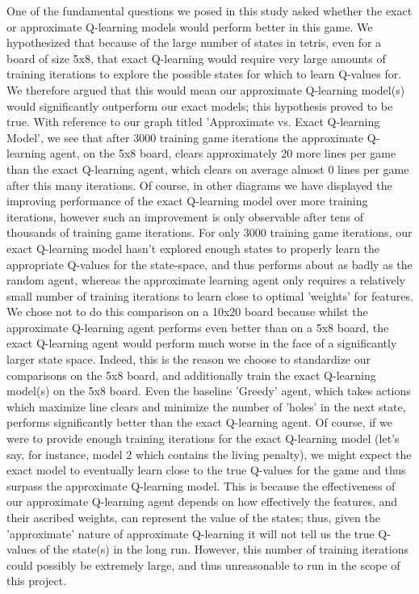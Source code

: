 \documentclass[10pt]{article}
\begin{document}
One of the fundamental questions we posed in this study asked whether the exact or approximate Q-learning models would perform better in this game. We hypothesized that because of the large number of states in tetris, even for a board of size 5x8, that exact Q-learning would require very large amounts of training iterations to explore the possible states for which to learn Q-values for. We therefore argued that this would mean our approximate Q-learning model(s) would significantly outperform our exact models; this hypothesis proved to be true. With reference to our graph titled 'Approximate vs. Exact Q-learning Model', we see that after 3000 training game iterations the approximate Q-learning agent, on the 5x8 board, clears approximately 20 more lines per game than the exact Q-learning agent, which clears on average almost 0 lines per game after this many iterations. Of course, in other diagrams we have displayed the improving performance of the exact Q-learning model over more training iterations, however such an improvement is only observable after tens of thousands of training game iterations. For only 3000 training game iterations, our exact Q-learning model hasn't explored enough states to properly learn the appropriate Q-values for the state-space, and thus performs about as badly as the random agent, whereas the approximate learning agent only requires a relatively small number of training iterations to learn close to optimal 'weights' for features. We chose not to do this comparison on a 10x20 board because whilst the approximate Q-learning agent performs even better than on a 5x8 board, the exact Q-learning agent would perform much worse in the face of a significantly larger state space. Indeed, this is the reason we choose to standardize our comparisons on the 5x8 board, and additionally train the exact Q-learning model(s) on the 5x8 board. Even the baseline 'Greedy' agent, which takes actions which maximize line clears and minimize the number of 'holes' in the next state, performs significantly better than the exact Q-learning agent. Of course, if we were to provide enough training iterations for the exact Q-learning model (let's say, for instance, model 2 which contains the living penalty), we might expect the exact model to eventually learn close to the true Q-values for the game and thus surpass the approximate Q-learning model. This is because the effectiveness of our approximate Q-learning agent depends on how effectively the features, and their ascribed weights, can represent the value of the states; thus, given the 'approximate' nature of approximate Q-learning it will not tell us the true Q-values of the state(s) in the long run. However, this number of training iterations could possibly be extremely large, and thus  unreasonable to run in the scope of this project.
\end{document}
